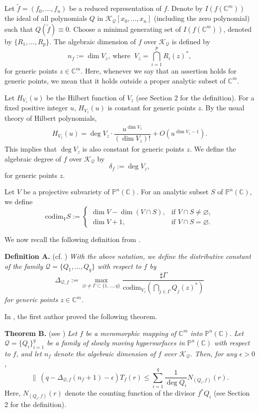 \documentclass[12pt,leqno]{amsart}
\def\underset#1#2{{\mathrel{\mathop {{}_{} {#2}}\limits_{{#1}_{}}}}}
\newcommand{\C}{{\mathbb{C}}}
\renewcommand{\P}{{\mathbb{P}}}
\numberwithin{equation}{section}
\begin{document}
Let $\tilde f=(f_0,\ldots,f_n)$ be a reduced representation of $f$. Denote by $I(f(\C^m))$ the ideal of all polynomials $Q$ in ${\mathcal K}_{\mathcal Q}[x_0,\ldots,x_n]$ (including the zero polynomial) such that $Q(\tilde f)\equiv 0$. Choose a minimal generating set of $I(f(\C^m))$, denoted by $\{R_1,\ldots,R_p\}$. The algebraic dimension of $f$ over $\mathcal K_{\mathcal Q}$ is defined by
$$
n_f:=\dim V_z,\ \text{where }\ V_z=\bigcap_{i=1}^pR_i(z)^*,
$$
for generic points $z\in\C^m$. Here, whenever we say that an assertion holds for generic points, we mean that it holds outside a proper analytic subset of $\C^m$.

Let $H_{V_z}(u)$ be the Hilbert function of $V_z$ (see Section 2 for the definition). For a fixed positive integer $u$, $H_{V_z}(u)$ is constant for generic points $z$. By the usual theory of Hilbert polynomials,
\begin{align*}
H_{V_z}(u)=\deg V_z\cdot\dfrac{u^{\dim V_z}}{(\dim V_z)!}+O(u^{\dim V_z-1}).
\end{align*}
This implies that $\deg V_z$ is also constant for generic points $z$. We define the algebraic degree of $f$ over $\mathcal K_{\mathcal Q}$ by
$$
\delta_f:=\deg V_z,
$$
for generic points $z$.

Let $V$ be a projective subvariety of $\P^n(\C)$. For an analytic subset $S$ of $\P^n(\C)$, we define
$$
\mathrm{codim}_VS:=
\begin{cases}
\dim V-\dim (V\cap S),&\text{if }V\cap S\ne\varnothing,\\
\dim V+1,&\text{if }V\cap S=\varnothing.
\end{cases}
$$

We now recall the following definition from \cite{Q22c}.

\vskip0.2cm
\noindent
{\bf Definition A.} (cf. \cite[Definition 3.3]{Q22c})
{\it With the above notation, we define the distributive constant of the family $\mathcal Q=\{Q_1,\ldots,Q_q\}$ with respect to $f$ by
$$\Delta_{\mathcal Q,f}:=\underset{\varnothing\ne\Gamma\subset\{1,\ldots,q\}}{\max}\dfrac{\sharp\Gamma}{\mathrm{codim}_{V_z}\left(\bigcap_{j\in\Gamma}Q_j(z)^*\right)}$$
for generic points $z\in\C^m$.}

In \cite{Q22c}, the first author proved the following theorem.

\vskip0.2cm
\noindent
{\bf Theorem B.} (see \cite[Theorem 1.1]{Q22c})
{\it Let $f$ be a meromorphic mapping of $\C^m$ into $\P^n(\C)$. Let $\mathcal Q=\{Q_i\}_{i=1}^q$ be a family of slowly moving hypersurfaces in $\P^n(\C)$ with respect to $f$, and let $n_f$ denote the algebraic dimension of $f$ over $\mathcal K_{\mathcal Q}$. Then, for any $\epsilon>0$,
$$\|\ (q-\Delta_{\mathcal Q,f}(n_f+1)-\epsilon)T_f(r)\le\sum_{i=1}^{q}\dfrac{1}{\deg Q_i}N_{(Q_i,f)}(r).$$}
Here, $N_{(Q_i,f)}(r)$ denote the counting function of the divisor $f^*Q_i$ (see Section 2 for the definition).
\end{document}
